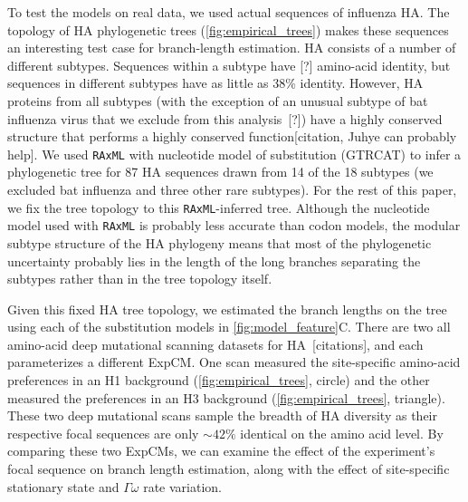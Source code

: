 \documentclass[11pt]{article}
\newcommand\jdbcomment[1]{{\color{red}[#1]}}
\begin{document}
To test the models on real data, we used actual sequences of influenza HA. 
The topology of HA phylogenetic trees (\ref{fig:empirical_trees}) makes these sequences an interesting test case for branch-length estimation.
HA consists of a number of different subtypes.
Sequences within a subtype have \jdbcomment{?} amino-acid identity, but sequences in different subtypes have as little as 38\% identity.
However, HA proteins from all subtypes (with the exception of an unusual subtype of bat influenza virus that we exclude from this analysis~\jdbcomment{?}) have a highly conserved structure that performs a highly conserved function\jdbcomment{citation, Juhye can probably help}.
We used \texttt{RAxML} with nucleotide model of substitution (GTRCAT) to infer a phylogenetic tree for 87 HA sequences drawn from 14 of the 18 subtypes (we excluded bat influenza and three other rare subtypes).
For the rest of this paper, we fix the tree topology to this \texttt{RAxML}-inferred tree.
Although the nucleotide model used with \texttt{RAxML} is probably less accurate than codon models, the modular subtype structure of the HA phylogeny means that most of the phylogenetic uncertainty probably lies in the length of the long branches separating the subtypes rather than in the tree topology itself.
 
Given this fixed HA tree topology, we estimated the branch lengths on the tree using each of the substitution models in \ref{fig:model_feature}C. 
There are two all amino-acid deep mutational scanning datasets for HA~\jdbcomment{citations}, and each parameterizes a different ExpCM.
One scan measured the site-specific amino-acid preferences in an H1 background (\ref{fig:empirical_trees}, circle) and the other measured the preferences in an H3 background (\ref{fig:empirical_trees}, triangle). 
These two deep mutational scans sample the breadth of HA diversity as their respective focal sequences are only $\sim42\%$ identical on the amino acid level. 
By comparing these two ExpCMs, we can examine the effect of the experiment's focal sequence on branch length estimation, along with the effect of site-specific stationary state and $\Gamma\omega$ rate variation.
\end{document}
